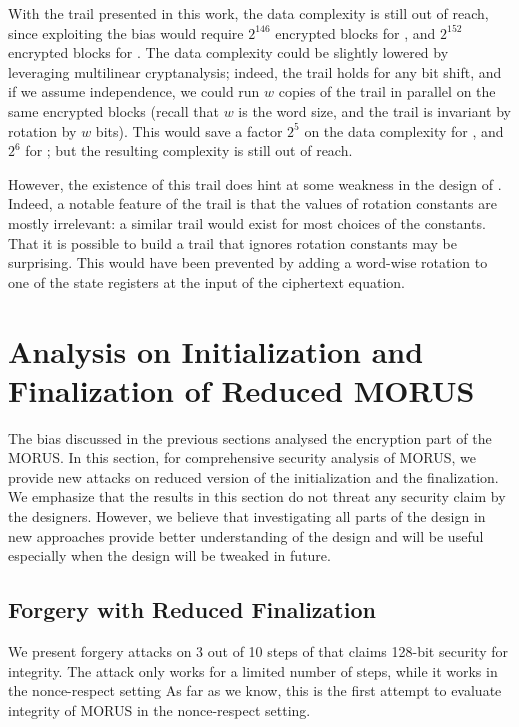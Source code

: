 \documentclass{llncs}
\begin{document}
With the trail presented in this work, the data complexity is still out of reach, since exploiting the bias would require $2^{146}$ encrypted blocks for , and $2^{152}$ encrypted blocks for . The data complexity could be slightly lowered by leveraging multilinear cryptanalysis; indeed, the trail holds for any bit shift, and if we assume independence, we could run $w$ copies of the trail in parallel on the same encrypted blocks (recall that $w$ is the word size, and the trail is invariant by rotation by $w$ bits). This would save a factor $2^5$ on the data complexity for , and $2^6$ for ; but the resulting complexity is still out of reach.

However, the existence of this trail does hint at some weakness in the design of . Indeed, a notable feature of the trail is that the values of rotation constants are mostly irrelevant: a similar trail would exist for most choices of the constants. That it is possible to build a trail that ignores rotation constants may be surprising. This would have been prevented by adding a word-wise rotation to one of the state registers at the input of the ciphertext equation.


\section{Analysis on Initialization and Finalization of Reduced MORUS}
The bias discussed in the previous sections analysed the encryption part of the MORUS. In this section, for comprehensive security analysis of MORUS, we provide new attacks on reduced version of the initialization and the finalization. We emphasize that the results in this section do not threat any security claim by the designers. However, we believe that investigating all parts of the design in new approaches provide better understanding of the design and will be useful especially when the design will be tweaked in future.

\subsection{Forgery with Reduced Finalization}
We present forgery attacks on 3 out of 10 steps of  that claims 128-bit security for integrity. The attack only works for a limited number of steps, while it works in the nonce-respect setting As far as we know, this is the first attempt to evaluate integrity of MORUS in the nonce-respect setting.
\end{document}
